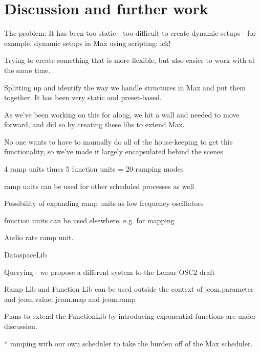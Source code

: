 \documentclass{article}
\begin{document}


\section{Discussion and further work} %
\label{sec:discussion_and_further_work}

The problem: 
It has been too static
    - too difficult to create dynamic setups
    - for example, dynamic setups in Max using scripting: ick!

Trying to create something that is more flexible, but also easier to work with at the same time.

Splitting up and identify the way we handle structures in Max and put them together.  It has been very static and preset-based.

As we've been working on this for along, we hit a wall and needed to move forward, and did so by creating these libs to extend Max.  

No one wants to have to manually do all of the house-keeping to get this functionality, so we've made it largely encapsulated behind the scenes.


\cite{Momeni:2003}



4 ramp units times 5 function units = 20 ramping modes

ramp units can be used for other scheduled processes as well

Possibility of expanding ramp units as low frequency oscillators

function units can be used elsewhere, e.g. for mapping

Audio rate ramp unit.

DataspaceLib

Querying - we propose a different system to the Lemur OSC2 draft

Ramp Lib and Function Lib can be used outside the context of jcom.parameter and jcom.value: jcom.map and jcom.ramp


Plans to extend the FunctionLib by introducing exponential functions are under discussion. %


* ramping with our own scheduler to take the burden off of the Max scheduler.
\end{document}
